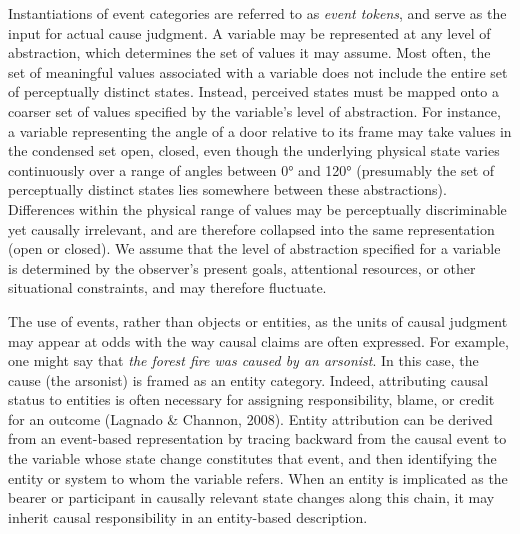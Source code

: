 \documentclass[10pt,letterpaper]{article}
\begin{document}
Instantiations of event categories are referred to as \textit{event tokens}, and serve as the input for actual cause judgment. A variable may be represented at any level of abstraction, which determines the set of values it may assume. Most often, the set of meaningful values associated with a variable does not include the entire set of perceptually distinct states. Instead, perceived states must be mapped onto a coarser set of values specified by the variable’s level of abstraction. For instance, a variable representing the angle of a door relative to its frame may take values in the condensed set {open, closed}, even though the underlying physical state varies continuously over a range of angles between 0° and 120° (presumably the set of perceptually distinct states lies somewhere between these abstractions). Differences within the physical range of values may be perceptually discriminable yet causally irrelevant, and are therefore collapsed into the same representation (open or closed). We assume that the level of abstraction specified for a variable is determined by the observer’s present goals, attentional resources, or other situational constraints, and may therefore fluctuate.

The use of events, rather than objects or entities, as the units of causal judgment may appear at odds with the way causal claims are often expressed. For example, one might say that \textit{the forest fire was caused by an arsonist}. In this case, the cause (the arsonist) is framed as an entity category. Indeed, attributing causal status to entities is often necessary for assigning responsibility, blame, or credit for an outcome (Lagnado \& Channon, 2008). Entity attribution can be derived from an event-based representation by tracing backward from the causal event to the variable whose state change constitutes that event, and then identifying the entity or system to whom the variable refers. When an entity is implicated as the bearer or participant in causally relevant state changes along this chain, it may inherit causal responsibility in an entity-based description.
\end{document}
